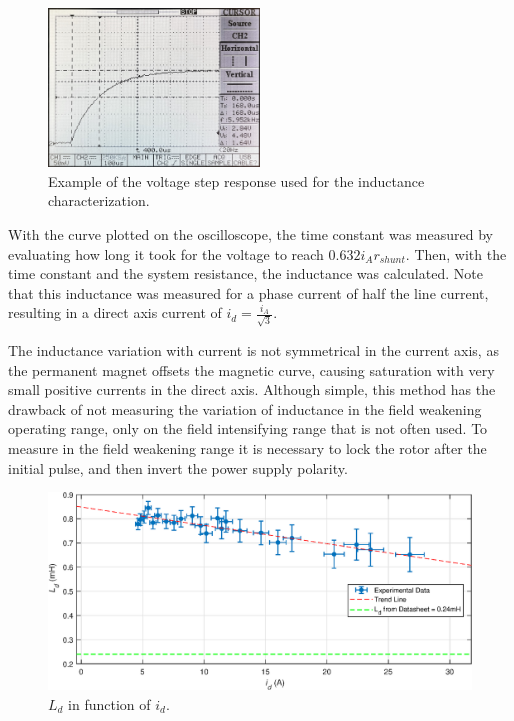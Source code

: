 \begin{figure}[!htb]
	\centering
	\includegraphics[width=0.5\textwidth]{Figures/induc_oscilloscope.JPEG}
	\caption[Example of the voltage step response used for the inductance characterization.]{Example of the voltage step response used for the inductance characterization.}
	\label{fig:inductance_oscilloscope} %
\end{figure}

With the curve plotted on the oscilloscope, the time constant was measured by evaluating how long it took for the voltage to reach $0.632 i_A r_{shunt}$. Then, with the time constant and the system resistance, the inductance was calculated. Note that this inductance was measured for a phase current of half the line current, resulting in a direct axis current of $i_d = \frac{i_A}{\sqrt{3}}$.

The inductance variation with current is not symmetrical in the current axis, as the permanent magnet offsets the magnetic curve, causing saturation with very small positive currents in the direct axis. Although simple, this method has the drawback of not measuring the variation of inductance in the field weakening operating range, only on the field intensifying range that is not often used. To measure in the field weakening range it is necessary to lock the rotor after the initial pulse, and then invert the power supply polarity.

\begin{figure}[!htb]
	\centering
	\includegraphics[width=1\textwidth]{Figures/Ld_id.eps}
	\caption[$L_d$ in function of $i_d$.]{$L_d$ in function of $i_d$.}
	\label{fig:ld_graph} %
\end{figure}

